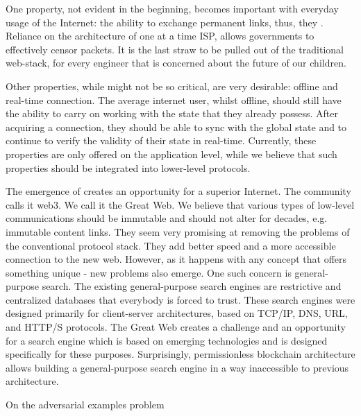 \documentclass[8pt,oneside]{amsart}
\makeatletter
\newcommand{\linkgreen}[2]{\href{#1}{\color{green}{#2}}}
\renewcommand\subsection{\@startsection{subsection}
                                    {2}{\z@}
                                    {-3.25ex\@plus -1ex \@minus -.2ex}
                                    {0ex \@plus .2ex}
                                    {\play\Large}
                        }
\newcommand{\titleSection}[1]{\subsection{#1}}
\makeatother
\begin{document}
One property, not evident in the beginning, becomes important with everyday usage of the Internet: the ability to exchange permanent links, thus, they \linkgreen{https://ipfs.io/ipfs/QmNhaUrhM7KcWzFYdBeyskoNyihrpHvUEBQnaddwPZigcN}{would not break after time had passed}. Reliance on the architecture of one at a time ISP, allows governments to effectively censor packets. It is the last straw to be pulled out of the traditional web-stack, for every engineer that is concerned about the future of our children.

Other properties, while might not be so critical, are very desirable: offline and real-time connection. The average internet user, whilst offline, should still have the ability to carry on working with the state that they already possess. After acquiring a connection, they should be able to sync with the global state and to continue to verify the validity of their state in real-time. Currently, these properties are only offered on the application level, while we believe that such properties should be integrated into lower-level protocols.

The emergence of \linkgreen{https://ipfs.io/ipfs/Qmf2rKkDPSsvdudwSmdDPbZuYae8XRV26c1wAFCCvg8Dhw}{a brand-new web-stack} creates an opportunity for a superior Internet. The community calls it web3. We call it the Great Web. We believe that various types of low-level communications should be immutable and should not alter for decades, e.g. immutable content links. They seem very promising at removing the problems of the conventional protocol stack. They add better speed and a more accessible connection to the new web. However, as it happens with any concept that offers something unique - new problems also emerge. One such concern is general-purpose search. The existing general-purpose search engines are restrictive and centralized databases that everybody is forced to trust. These search engines were designed primarily for client-server architectures, based on TCP/IP, DNS, URL, and HTTP/S protocols. The Great Web creates a challenge and an opportunity for a search engine which is based on emerging technologies and is designed specifically for these purposes. Surprisingly, permissionless blockchain architecture allows building a general-purpose search engine in a way inaccessible to previous architecture.

\titleSection{On the adversarial examples problem}\label{adversarial-examples}
\end{document}
